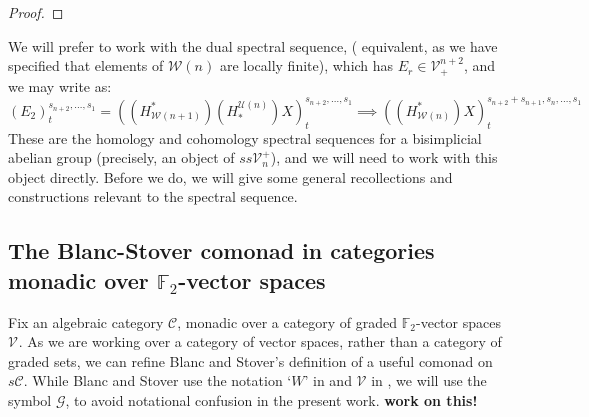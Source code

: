 \documentclass[11pt]{amsart}
\theoremstyle{plain}
\theoremstyle{definition}
\newcommand{\scrG}{\mathscr{G}}
\newcommand{\scrV}{\mathscr{V}}
\newcommand{\calU}{\mathcal{U}}
\newcommand{\calV}{\mathcal{V}}
\newcommand{\calw}{\mathcal{W}}
\newcommand{\calc}{\mathcal{C}}
\theoremstyle{plain}
\newcommand{\vect}[2]{\calV^{#1}_{#2}}
\newcommand{\BSW}{{\scrG}}
\newcommand{\F}{\mathbb{F}}
\newcommand{\Ftwo}{\F_2}
\begin{document}
\begin{Composite functor spectral sequences}
\begin{proof}
\end{proof}
We will prefer to work with the dual spectral sequence, ( equivalent, as we have specified that elements of $\calw(n)$ are locally finite), which has $E_r\in\vect{n+2}{+}$, and we may write as:
\[(E_2)^{s_{n+2},\ldots,s_1}_t=((H^*_{\calw(n+1)})(H_*^{\calU(n)})X)^{s_{n+2},\ldots,s_1}_t\implies ((H^*_{\calw(n)})X)^{s_{n+2}+s_{n+1},s_n,\ldots,s_1}_t\]
These are the homology and cohomology spectral sequences for a bisimplicial abelian group (precisely, an object of $ss\vect{+}{n}$), and we will need to work with this object directly. Before we do, we will give some general recollections and constructions relevant to the spectral sequence.

\subsection{The Blanc-Stover comonad in categories monadic over $\Ftwo $-vector spaces}
Fix an algebraic category $\calc$, monadic over a category of graded $\Ftwo $-vector spaces $\vect{}{}$. %
As we are working over a category of vector spaces, rather than a category of graded sets, we can refine Blanc and Stover's definition  of a useful comonad on $s\calc$. While Blanc and Stover use the notation `$W$' in \cite{Blanc_Stover-Groth_SS.pdf} and $\scrV$ in \cite{StoverVanKampen.pdf}, we will use the symbol $\BSW$, to avoid notational confusion in the present work. \textbf{{work on this!}}


\end{Composite functor spectral sequences}
\end{document}
